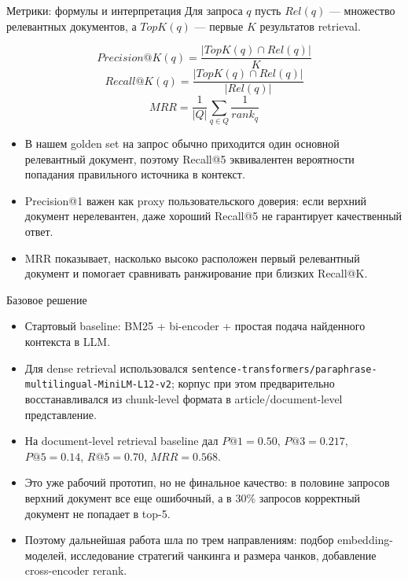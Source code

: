 \documentclass[aspectratio=169,11pt]{beamer}
\begin{document}
\begin{frame}{Метрики: формулы и интерпретация}
  \small
  Для запроса $q$ пусть $Rel(q)$ --- множество релевантных документов, а $TopK(q)$ --- первые $K$ результатов retrieval.

  \vspace{0.2em}
  \[
    Precision@K(q) = \frac{|TopK(q) \cap Rel(q)|}{K}
  \]
  \[
    Recall@K(q) = \frac{|TopK(q) \cap Rel(q)|}{|Rel(q)|}
  \]
  \[
    MRR = \frac{1}{|Q|} \sum_{q \in Q} \frac{1}{rank_q}
  \]

  \footnotesize
  \begin{itemize}
    \item В нашем golden set на запрос обычно приходится один основной релевантный документ, поэтому Recall@5 эквивалентен вероятности попадания правильного источника в контекст.
    \item Precision@1 важен как proxy пользовательского доверия: если верхний документ нерелевантен, даже хороший Recall@5 не гарантирует качественный ответ.
    \item MRR показывает, насколько высоко расположен первый релевантный документ и помогает сравнивать ранжирование при близких Recall@K.
  \end{itemize}
\end{frame}

\begin{frame}{Базовое решение}
  \small
  \begin{itemize}
    \item Стартовый baseline: BM25 + bi-encoder + простая подача найденного контекста в LLM.
    \item Для dense retrieval использовался \texttt{sentence-transformers/paraphrase-multilingual-MiniLM-L12-v2}; корпус при этом предварительно восстанавливался из chunk-level формата в article/document-level представление.
    \item На document-level retrieval baseline дал $P@1 = 0.50$, $P@3 = 0.217$, $P@5 = 0.14$, $R@5 = 0.70$, $MRR = 0.568$.
    \item Это уже рабочий прототип, но не финальное качество: в половине запросов верхний документ все еще ошибочный, а в 30\% запросов корректный документ не попадает в top-5.
    \item Поэтому дальнейшая работа шла по трем направлениям: подбор embedding-моделей, исследование стратегий чанкинга и размера чанков, добавление cross-encoder rerank.
  \end{itemize}
\end{frame}
\end{document}
